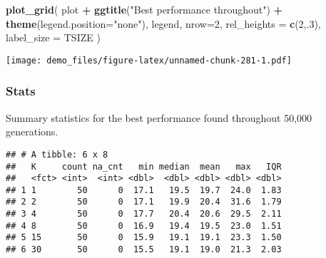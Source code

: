 \documentclass[]{book}
\newenvironment{Shaded}{\begin{snugshade}}{\end{snugshade}}
\newcommand{\DataTypeTok}[1]{\textcolor[rgb]{0.13,0.29,0.53}{#1}}
\newcommand{\DecValTok}[1]{\textcolor[rgb]{0.00,0.00,0.81}{#1}}
\newcommand{\KeywordTok}[1]{\textcolor[rgb]{0.13,0.29,0.53}{\textbf{#1}}}
\newcommand{\NormalTok}[1]{#1}
\newcommand{\OperatorTok}[1]{\textcolor[rgb]{0.81,0.36,0.00}{\textbf{#1}}}
\newcommand{\OtherTok}[1]{\textcolor[rgb]{0.56,0.35,0.01}{#1}}
\newcommand{\StringTok}[1]{\textcolor[rgb]{0.31,0.60,0.02}{#1}}
\begin{document}
\begin{Shaded}
\begin{Highlighting}[]
\KeywordTok{plot_grid}\NormalTok{(}
\NormalTok{  plot }\OperatorTok{+}
\StringTok{    }\KeywordTok{ggtitle}\NormalTok{(}\StringTok{"Best performance throughout"}\NormalTok{) }\OperatorTok{+}
\StringTok{    }\KeywordTok{theme}\NormalTok{(}\DataTypeTok{legend.position=}\StringTok{"none"}\NormalTok{),}
\NormalTok{  legend,}
  \DataTypeTok{nrow=}\DecValTok{2}\NormalTok{,}
  \DataTypeTok{rel_heights =} \KeywordTok{c}\NormalTok{(}\DecValTok{2}\NormalTok{,.}\DecValTok{3}\NormalTok{),}
  \DataTypeTok{label_size =}\NormalTok{ TSIZE}
\NormalTok{)}
\end{Highlighting}
\end{Shaded}

\texttt{[image: demo\_files/figure-latex/unnamed-chunk-281-1.pdf]}

\hypertarget{stats-53}{%
\subsubsection{Stats}\label{stats-53}}

Summary statistics for the best performance found throughout 50,000 generations.

\begin{Shaded}
\end{Shaded}

\begin{verbatim}
## # A tibble: 6 x 8
##   K     count na_cnt   min median  mean   max   IQR
##   <fct> <int>  <int> <dbl>  <dbl> <dbl> <dbl> <dbl>
## 1 1        50      0  17.1   19.5  19.7  24.0  1.83
## 2 2        50      0  17.1   19.9  20.4  31.6  1.79
## 3 4        50      0  17.7   20.4  20.6  29.5  2.11
## 4 8        50      0  16.9   19.4  19.5  23.0  1.51
## 5 15       50      0  15.9   19.1  19.1  23.3  1.50
## 6 30       50      0  15.5   19.1  19.0  21.3  2.03
\end{verbatim}
\end{document}
